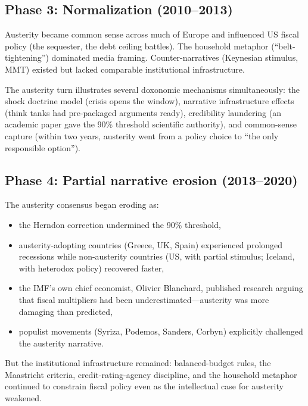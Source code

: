 \subsection{Phase 3: Normalization (2010--2013)}

Austerity became common sense across much of Europe and influenced US fiscal policy (the sequester, the debt ceiling battles).
The household metaphor (``belt-tightening'') dominated media framing.
Counter-narratives (Keynesian stimulus, MMT) existed but lacked comparable institutional infrastructure.

\begin{remark}
The austerity turn illustrates several doxonomic mechanisms simultaneously:
the shock doctrine model (crisis opens the window),
narrative infrastructure effects (think tanks had pre-packaged arguments ready),
credibility laundering (an academic paper gave the 90\% threshold scientific authority),
and common-sense capture (within two years, austerity went from a policy choice to ``the only responsible option'').
\end{remark}

\subsection{Phase 4: Partial narrative erosion (2013--2020)}

The austerity consensus began eroding as:
\begin{itemize}[nosep]
  \item the Herndon correction undermined the 90\% threshold,
  \item austerity-adopting countries (Greece, UK, Spain) experienced prolonged recessions while non-austerity countries (US, with partial stimulus; Iceland, with heterodox policy) recovered faster,
  \item the IMF's own chief economist, Olivier Blanchard, published research arguing that fiscal multipliers had been underestimated---austerity was more damaging than predicted,
  \item populist movements (Syriza, Podemos, Sanders, Corbyn) explicitly challenged the austerity narrative.
\end{itemize}

But the institutional infrastructure remained: balanced-budget rules, the Maastricht criteria, credit-rating-agency discipline, and the household metaphor continued to constrain fiscal policy even as the intellectual case for austerity weakened.


